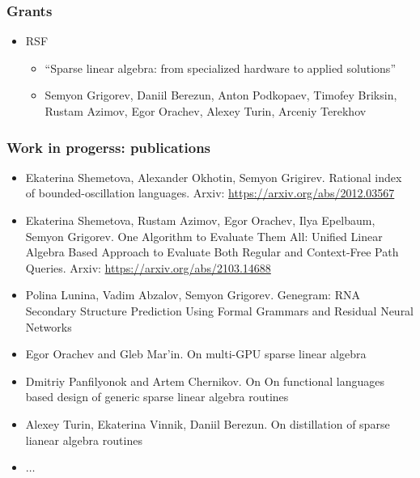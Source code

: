 \documentclass[xcolor=table, aspectratio=169]{beamer}
\begin{document}
\begin{frame}[fragile]

  \frametitle{Grants}
\begin{itemize}
      \item[\faTimes] RSF 
      \begin{itemize}
        \item ``Sparse linear algebra: from specialized hardware to applied solutions''
        \item Semyon Grigorev, Daniil Berezun, Anton Podkopaev, Timofey Briksin, Rustam Azimov, Egor Orachev, Alexey Turin, Arceniy Terekhov
      \end{itemize}
\end{itemize}
\end{frame}

\begin{frame}[fragile]

\frametitle{Work in progerss: publications}
\begin{itemize}
      \item[\faHourglassHalf] Ekaterina Shemetova, Alexander Okhotin, Semyon Grigirev. Rational index of bounded-oscillation languages. Arxiv: \url{https://arxiv.org/abs/2012.03567}
      
      \item[\faHourglassHalf] Ekaterina Shemetova, Rustam Azimov, Egor Orachev, Ilya Epelbaum, Semyon Grigorev. One Algorithm to Evaluate Them All: Unified Linear Algebra Based Approach to Evaluate Both Regular and Context-Free Path Queries. Arxiv: \url{https://arxiv.org/abs/2103.14688}
      \item[\faHourglassHalf] Polina Lunina, Vadim Abzalov, Semyon Grigorev. Genegram: RNA Secondary Structure       Prediction Using Formal Grammars and Residual Neural Networks
      \pause
      \item[\faGears] Egor Orachev and Gleb Mar'in. On multi-GPU sparse linear algebra
      \item[\faGears] Dmitriy Panfilyonok and Artem Chernikov. On On functional languages based design of generic sparse linear algebra routines 
      \item[\faGears] Alexey Turin, Ekaterina Vinnik, Daniil Berezun. On distillation of sparse lianear algebra routines
      \item[\faGears] $\ldots$
\end{itemize}
\end{frame}
\end{document}
